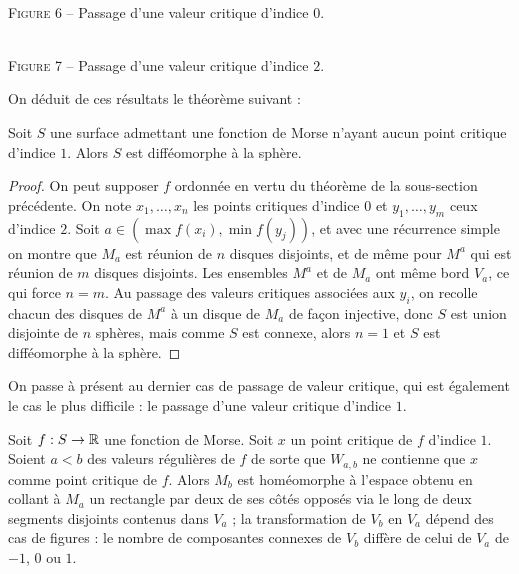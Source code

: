 \begin{center}
     \\
    \textsc{Figure 6} – Passage d'une valeur critique d'indice $0$.
\end{center}

\begin{center}
     \\
    \textsc{Figure 7} – Passage d'une valeur critique d'indice $2$.
\end{center}

On déduit de ces résultats le théorème suivant :
\begin{thm}[de Reeb]
    Soit $S$ une surface admettant une fonction de Morse n'ayant aucun point critique d'indice $1$.
    Alors $S$ est difféomorphe à la sphère. 
\end{thm}

\begin{proof}
    On peut supposer $f$ ordonnée en vertu du théorème de la sous-section précédente. 
    On note $x_1,\dots,x_n$ les points critiques d'indice $0$ et $y_1,\dots,y_m$ ceux d'indice $2$. 
    Soit $a\in(\max f(x_i),\min f(y_j))$, et avec une récurrence simple on montre que $M_a$ est 
    réunion de $n$ disques disjoints, et de même pour $M^a$ qui est réunion de $m$ disques 
    disjoints. 
    Les ensembles $M^a$ et de $M_a$ ont même bord $V_a$, ce qui force $n=m$. 
    Au passage des valeurs critiques associées aux $y_i$, on recolle chacun des disques de 
    $M^a$ à un disque de $M_a$ de façon injective, donc $S$ est union disjointe de $n$ sphères,
    mais comme $S$ est connexe, alors $n=1$ et $S$ est difféomorphe à la sphère. 
\end{proof}

On passe à présent au dernier cas de passage de valeur critique, qui est également le cas le 
plus difficile : le passage d'une valeur critique d'indice $1$. 

\begin{thm}
    Soit $f:S\to\operatorname{\mathbb R}$ une fonction de Morse. Soit $x$ un point critique de $f$ d'indice $1$.
    Soient $a<b$ des valeurs régulières de $f$ de sorte que $W_{a,b}$ ne contienne que $x$ comme 
    point critique de $f$. 
    Alors $M_b$ est homéomorphe à l'espace obtenu en collant à $M_a$ un rectangle par deux de 
    ses côtés opposés via le long de deux segments disjoints contenus dans $V_a$ ;
    la transformation de $V_b$ en $V_a$ dépend des cas de figures : le nombre de composantes 
    connexes de $V_b$ diffère de celui de $V_a$ de $-1$, $0$ ou $1$.
\end{thm}

